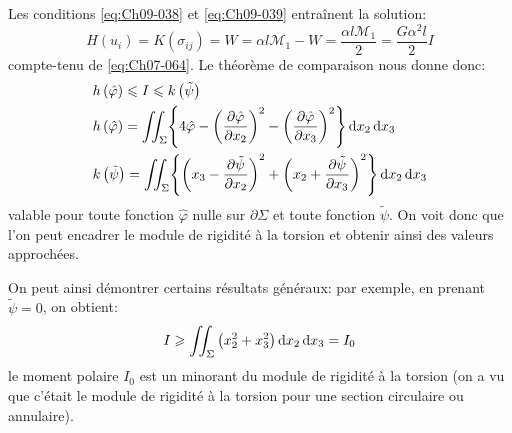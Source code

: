 Les conditions \eqref{eq:Ch09-038} et \eqref{eq:Ch09-039} entraînent la solution:
\begin{equation}
    H(u_i) = K (\sigma_{ij}) = W = \alpha l \mathcal{M}_1 - W = \frac{\alpha l \mathcal{M}_1}{2} = \frac{G\alpha^2 l}{2} I    
    \label{eq:Ch09-047}
\end{equation}
compte-tenu de \eqref{eq:Ch07-064}.
Le théorème de comparaison nous donne donc: 
\begin{equation}
    \begin{aligned}
        & h \left( \hat{\varphi} \right) \leqslant I \leqslant k \left( \tilde{\psi} \right) \\
        & h \left( \hat{\varphi} \right) = \iint_{\Sigma} \Biggl\{ 4 \hat{\varphi} - \left( \frac{\partial \hat{\varphi}}{\partial x_2} \right)^2 - \left( \frac{\partial \hat{\varphi}}{\partial x_3} \right)^2 \Biggr\} \mathop{\mathrm{{}d}}\mathopen{} x_2 \mathop{\mathrm{{}d}}\mathopen{} x_3 \\
        & k \left( \tilde{\psi} \right) = \iint_{\Sigma} \Biggl\{ \left( x_3 - \frac{\partial \tilde{\psi}}{\partial x_2} \right)^2 + \left( x_2 + \frac{\partial \tilde{\psi}}{\partial x_3} \right)^2 \Biggr\} \mathop{\mathrm{{}d}}\mathopen{} x_2 \mathop{\mathrm{{}d}}\mathopen{} x_3
    \end{aligned}
    \label{eq:Ch09-048} 
\end{equation}
valable pour toute fonction $\hat{\varphi}$ nulle sur $\partial \Sigma$ et toute fonction $\tilde{\psi}$.
On voit donc que l'on peut encadrer le module de rigidité à la torsion et obtenir ainsi des valeurs approchées. 

On peut ainsi démontrer certains résultats généraux: par exemple, en prenant $\tilde{\psi} = 0$, on obtient:
\begin{equation}
    I \geqslant \iint_{\Sigma} \left( x_2^2 + x_3^2 \right) \mathop{\mathrm{{}d}}\mathopen{} x_2 \mathop{\mathrm{{}d}}\mathopen{} x_3 = I_0
    \label{eq:Ch09-049}
\end{equation}
le moment polaire $I_0$ est un minorant du module de rigidité à la torsion (on a vu que c'était le module de rigidité à la torsion pour une section circulaire ou annulaire). 

